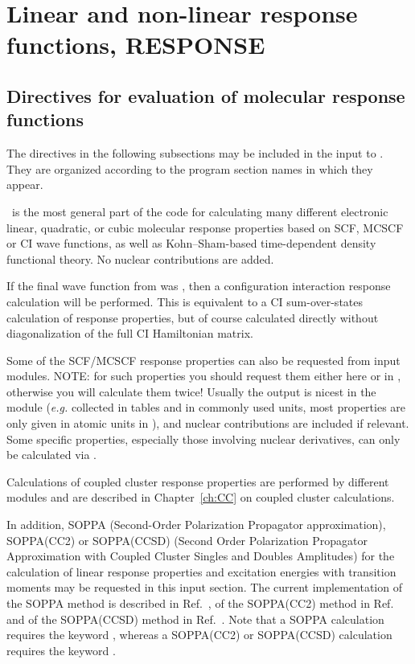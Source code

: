 \chapter{Linear and non-linear response functions, RESPONSE}
\label{ch:response}

\section{Directives for evaluation of molecular response functions}\label{sec:rspinp}

The directives in the following subsections may be included in the input to \resp.
They are organized according to the program section names in which they
appear.

\resp\ is the most general part of the code for calculating
many different electronic linear, quadratic, or cubic molecular
response properties based on SCF, MCSCF or CI wave functions, as well as Kohn--Sham-based time-dependent density functional theory.
No nuclear contributions are added.

If the final wave function from  was , then
a configuration interaction
response calculation will be performed.
This is equivalent to a CI sum-over-states
calculation of response properties,
but of course calculated directly without diagonalization of the full
CI Hamiltonian matrix.

Some of the SCF/MCSCF response properties can also be requested
from  input modules.
NOTE: for such properties you should request them either here or
in , otherwise you will calculate them twice!
Usually the output is nicest in
the  module ({\it e.g.\/} collected in tables and in
commonly used units, most properties are only given in atomic
units in \resp), and nuclear contributions are included if relevant.
Some specific properties, especially those involving nuclear derivatives,
can only be calculated via .

Calculations of coupled cluster response properties are performed
by different modules and are described
in Chapter~\ref{ch:CC} on coupled cluster calculations.

In addition, SOPPA
(Second-Order Polarization Propagator approximation),
SOPPA(CC2) or SOPPA(CCSD) (Second
Order Polarization Propagator Approximation with Coupled Cluster
Singles and Doubles Amplitudes) for the calculation of linear response
properties and excitation energies with transition moments may be
requested in this input section. The current implementation of the
SOPPA method is described in Ref.~\cite{mjpekdtehjajjojcp}, of the
SOPPA(CC2) method in Ref.~\cite{spas097} and of the SOPPA(CCSD) method
in Ref.~\cite{soppaccsd}. Note that a SOPPA calculation requires the
keyword , whereas a SOPPA(CC2) or SOPPA(CCSD) calculation
requires the keyword .


